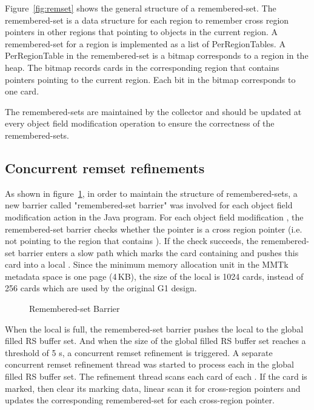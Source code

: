 Figure~\ref{fig:remset} shows the general structure of a remembered-set.
The remembered-set is a data structure for each region to remember cross
region pointers in other regions that pointing to objects in the current region.
A remembered-set for a region is implemented as a list of PerRegionTables.
A PerRegionTable in the remembered-set is a bitmap corresponds to a region in the heap.
The bitmap records cards in the corresponding region that contains pointers pointing to the
current region. Each bit in the bitmap corresponds to one card.

\begin{figure*}
  \centering
  \texttt{[image: \{figs/remset.png]}}
  \caption{Remembered-Set Structure}
  \label{fig:remset}
\end{figure*}

The remembered-sets are maintained by the collector and should be updated
at every object field modification operation to ensure the correctness of the remembered-sets.

\subsection{Concurrent remset refinements}

As shown in figure~\ref{fig:remsetbarrier}, in order to maintain the structure of remembered-sets,
a new barrier called "remembered-set barrier" was involved for each object field modification action in the Java program.
For each object field modification , the remembered-set barrier checks
whether the pointer  is a cross region pointer (i.e. not pointing to the region that contains ).
If the check succeeds, the remembered-set barrier enters a slow path which marks the
card containing  and pushes this card into a local .
Since the minimum memory allocation unit in the MMTk metadata space is one page (4\,KB), the size of
the local  is 1024 cards, instead of 256 cards which are used by the original G1 design.

\begin{figure}
  \centering
  
  \caption{Remembered-set Barrier}
  \label{fig:remsetbarrier}
\end{figure}

When the local  is full, the remembered-set barrier
pushes the local  to the global filled RS buffer set.
And when the size of the global filled RS buffer set reaches a threshold of 5 s,
a concurrent remset refinement is triggered.
A separate concurrent remset refinement thread was started to process each
 in the global filled RS buffer set.
The refinement thread scans each card of each .
If the card is marked, then clear its marking data, linear scan it for cross-region pointers
and updates the corresponding remembered-set for each cross-region pointer.

